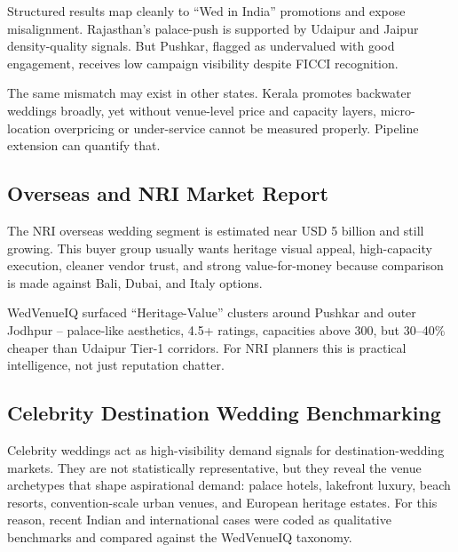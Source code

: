 \documentclass[conference]{IEEEtran}
\begin{document}
Structured results map cleanly to ``Wed in India'' promotions and expose misalignment. Rajasthan's palace-push is supported by Udaipur and Jaipur density-quality signals. But Pushkar, flagged as undervalued with good engagement, receives low campaign visibility despite FICCI recognition.

The same mismatch may exist in other states. Kerala promotes backwater weddings broadly, yet without venue-level price and capacity layers, micro-location overpricing or under-service cannot be measured properly. Pipeline extension can quantify that.

\subsection{Overseas and NRI Market Report}

The NRI overseas wedding segment is estimated near USD 5 billion and still growing. This buyer group usually wants heritage visual appeal, high-capacity execution, cleaner vendor trust, and strong value-for-money because comparison is made against Bali, Dubai, and Italy options.

WedVenueIQ surfaced ``Heritage-Value'' clusters around Pushkar and outer Jodhpur -- palace-like aesthetics, 4.5+ ratings, capacities above 300, but 30--40\% cheaper than Udaipur Tier-1 corridors. For NRI planners this is practical intelligence, not just reputation chatter.

\subsection{Celebrity Destination Wedding Benchmarking}

Celebrity weddings act as high-visibility demand signals for destination-wedding markets. They are not statistically representative, but they reveal the venue archetypes that shape aspirational demand: palace hotels, lakefront luxury, beach resorts, convention-scale urban venues, and European heritage estates. For this reason, recent Indian and international cases were coded as qualitative benchmarks and compared against the WedVenueIQ taxonomy.
\end{document}
